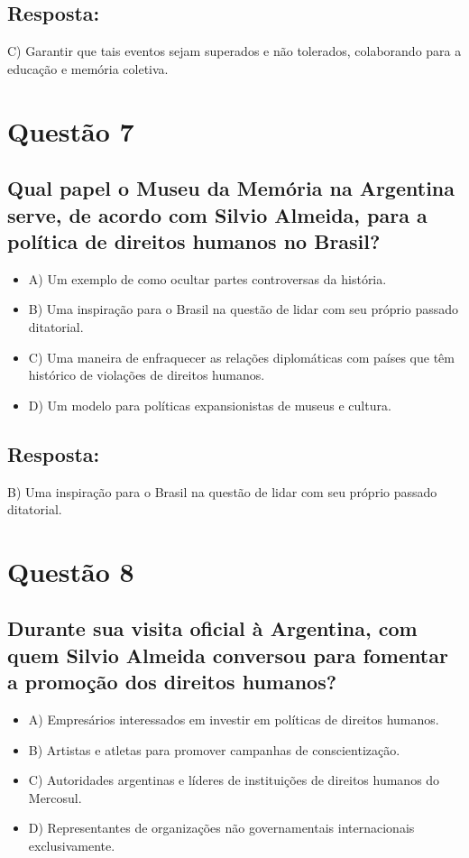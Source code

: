 \documentclass[
   article,       
   12pt,          
   oneside,       
   a4paper,       
   english,       
   brazil,        
   sumario=tradicional
   ]{abntex2}
\begin{document}
\subsection{Resposta:}
C) Garantir que tais eventos sejam superados e não tolerados, colaborando para a educação e memória coletiva.


\section{Questão 7}
\subsection*{Qual papel o Museu da Memória na Argentina serve, de acordo com Silvio Almeida, para a política de direitos humanos no Brasil?}
\begin{itemize}
    \item A) Um exemplo de como ocultar partes controversas da história.
    \item B) Uma inspiração para o Brasil na questão de lidar com seu próprio passado ditatorial.
    \item C) Uma maneira de enfraquecer as relações diplomáticas com países que têm histórico de violações de direitos humanos.
    \item D) Um modelo para políticas expansionistas de museus e cultura.
\end{itemize}
\subsection{Resposta:}
B) Uma inspiração para o Brasil na questão de lidar com seu próprio passado ditatorial.


\section{Questão 8}
\subsection*{Durante sua visita oficial à Argentina, com quem Silvio Almeida conversou para fomentar a promoção dos direitos humanos?}
\begin{itemize}
    \item A) Empresários interessados em investir em políticas de direitos humanos.
    \item B) Artistas e atletas para promover campanhas de conscientização.
    \item C) Autoridades argentinas e líderes de instituições de direitos humanos do Mercosul.
    \item D) Representantes de organizações não governamentais internacionais exclusivamente.
\end{itemize}
\end{document}
